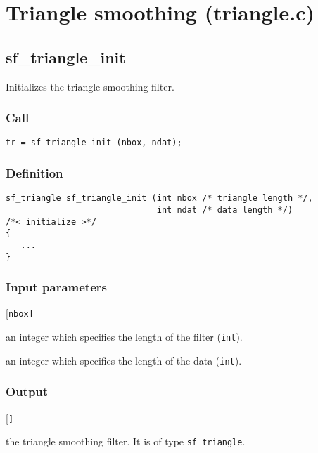 \section{Triangle smoothing (triangle.c)}\label{sec:triangle.c}




\subsection{{sf\_triangle\_init}}
Initializes the triangle smoothing filter.

\subsubsection*{Call}
\begin{verbatim}tr = sf_triangle_init (nbox, ndat);\end{verbatim}

\subsubsection*{Definition}
\begin{verbatim}
sf_triangle sf_triangle_init (int nbox /* triangle length */, 
                              int ndat /* data length */)
/*< initialize >*/
{
   ...
}
\end{verbatim}

\subsubsection*{Input parameters}
\begin{desclist}{\tt }{\quad}[\tt nbox]
   \setlength\itemsep{0pt}
   \item[nbox] an integer which specifies the length of the filter (\texttt{int}). 
   \item[ndat] an integer which specifies the length of the data (\texttt{int}).  
\end{desclist}

\subsubsection*{Output}
\begin{desclist}{\tt }{\quad}[\tt ]
   \setlength\itemsep{0pt}
   \item[tr] the triangle smoothing filter. It is of type \texttt{sf\_triangle}.
\end{desclist}




